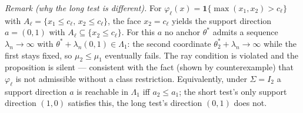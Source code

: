 \documentclass[12pt]{article}
\begin{document}
\noindent\emph{Remark (why the long test is different).} For $\varphi_\ell(x)=\mathbf 1\{\max(x_1,x_2)>c_\ell\}$ with $A_\ell=\{x_1\le c_\ell,\,x_2\le c_\ell\}$, the face $x_2=c_\ell$ yields the support direction $a=(0,1)$ with $A_\ell\subseteq\{x_2\le c_\ell\}$. For this $a$ no anchor $\theta^*$ admits a sequence $\lambda_n\to\infty$ with $\theta^*+\lambda_n(0,1)\in\Lambda_1$: the second coordinate $\theta^*_2+\lambda_n\to\infty$ while the first stays fixed, so $\mu_2\le\mu_1$ eventually fails. The ray condition is violated and the proposition is silent --- consistent with the fact (shown by counterexample) that $\varphi_\ell$ is not admissible without a class restriction. Equivalently, under $\Sigma=I_2$ a support direction $a$ is reachable in $\Lambda_1$ iff $a_2\le a_1$; the short test's only support direction $(1,0)$ satisfies this, the long test's direction $(0,1)$ does not.
\end{document}
